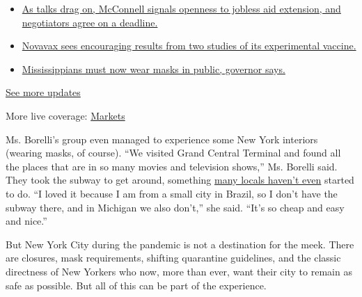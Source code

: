 \begin{itemize}
\tightlist
\item
  \href{https://www.nytimes3xbfgragh.onion/2020/08/04/world/coronavirus-cases.html?action=click\&pgtype=Article\&state=default\&region=MAIN_CONTENT_1\&context=storylines_live_updates\#link-762df92}{As
  talks drag on, McConnell signals openness to jobless aid extension,
  and negotiators agree on a deadline.}
\item
  \href{https://www.nytimes3xbfgragh.onion/2020/08/04/world/coronavirus-cases.html?action=click\&pgtype=Article\&state=default\&region=MAIN_CONTENT_1\&context=storylines_live_updates\#link-1228a480}{Novavax
  sees encouraging results from two studies of its experimental
  vaccine.}
\item
  \href{https://www.nytimes3xbfgragh.onion/2020/08/04/world/coronavirus-cases.html?action=click\&pgtype=Article\&state=default\&region=MAIN_CONTENT_1\&context=storylines_live_updates\#link-794484ed}{Mississippians
  must now wear masks in public, governor says.}
\end{itemize}

\href{https://www.nytimes3xbfgragh.onion/2020/08/04/world/coronavirus-cases.html?action=click\&pgtype=Article\&state=default\&region=MAIN_CONTENT_1\&context=storylines_live_updates}{See
more updates}

More live coverage:
\href{https://www.nytimes3xbfgragh.onion/live/2020/08/04/business/stock-market-today-coronavirus?action=click\&pgtype=Article\&state=default\&region=MAIN_CONTENT_1\&context=storylines_live_updates}{Markets}

Ms. Borelli's group even managed to experience some New York interiors
(wearing masks, of course). ``We visited Grand Central Terminal and
found all the places that are in so many movies and television shows,''
Ms. Borelli said. They took the subway to get around, something
\href{https://www.nytimes3xbfgragh.onion/2020/07/17/nyregion/coronavirus-subways-spread-nyc.html}{many
locals haven't even} started to do. ``I loved it because I am from a
small city in Brazil, so I don't have the subway there, and in Michigan
we also don't,'' she said. ``It's so cheap and easy and nice.''

But New York City during the pandemic is not a destination for the meek.
There are closures, mask requirements, shifting quarantine guidelines,
and the classic directness of New Yorkers who now, more than ever, want
their city to remain as safe as possible. But all of this can be part of
the experience.

